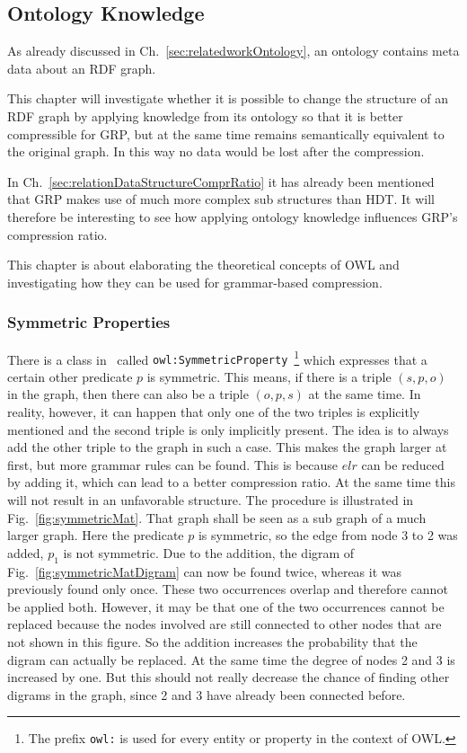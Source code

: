 \subsection{Ontology Knowledge}\label{sec:approachOntKnowledge}

As already discussed in Ch.~\ref{sec:relatedworkOntology}, an ontology contains meta data about an RDF graph.

This chapter will investigate whether it is possible to change the structure of an RDF graph by applying knowledge from its ontology so that it is better compressible for GRP, but at the same time remains semantically equivalent to the original graph. In this way no data would be lost after the compression.

In Ch.~\ref{sec:relationDataStructureComprRatio} it has already been mentioned that GRP makes use of much more complex sub structures than HDT. It will therefore be interesting to see how applying ontology knowledge influences GRP's compression ratio.

This chapter is about elaborating the theoretical concepts of OWL and investigating how they can be used for grammar-based compression.

\subsubsection{Symmetric Properties}


There is a class in~\cite{owl} called {\tt owl:SymmetricProperty}~\footnote{The prefix {\tt owl:} is used for every entity or property in the context of OWL.} which expresses that a certain other predicate $p$ is symmetric. This means, if there is a triple $(s,p,o)$ in the graph, then there can also be a triple $(o,p,s)$ at the same time. In reality, however, it can happen that only one of the two triples is explicitly mentioned and the second triple is only implicitly present. The idea is to always add the other triple to the graph in such a case. This makes the graph larger at first, but more grammar rules can be found. This is because $elr$ can be reduced by adding it, which can lead to a better compression ratio. At the same time this will not result in an unfavorable structure. The procedure is illustrated in Fig.~\ref{fig:symmetricMat}. That graph shall be seen as a sub graph of a much larger graph. Here the predicate $p$ is symmetric, so the edge from node 3 to 2 was added, $p_1$ is not symmetric. Due to the addition, the digram of Fig.~\ref{fig:symmetricMatDigram} can now be found twice, whereas it was previously found only once. These two occurrences overlap and therefore cannot be applied both. However, it may be that one of the two occurrences cannot be replaced because the nodes involved are still connected to other nodes that are not shown in this figure. So the addition increases the probability that the digram can actually be replaced. At the same time the degree of nodes 2 and 3 is increased by one. But this should not really decrease the chance of finding other digrams in the graph, since 2 and 3 have already been connected before.


